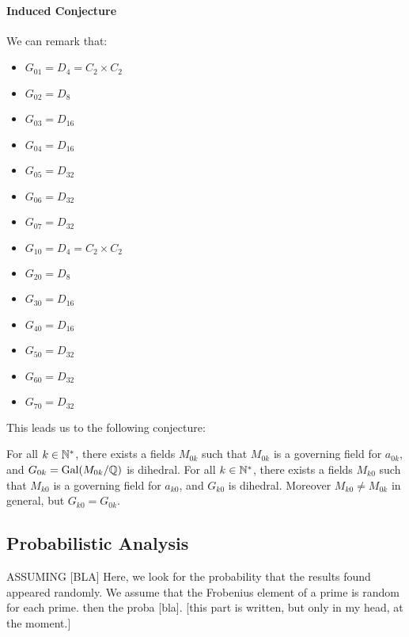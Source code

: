 \paragraph{Induced Conjecture}
We can remark that:
\begin{multicols}{2}
	\begin{itemize}
		\item $G_{01} = D_4 = C_2 \times C_2$
		\item $G_{02} = D_8$
		\item $G_{03} = D_{16}$
		\item $G_{04} = D_{16}$
		\item $G_{05} = D_{32}$
		\item $G_{06} = D_{32}$
		\item $G_{07} = D_{32}$
	\end{itemize}
	\begin{itemize}
		\item $G_{10} = D_4 = C_2 \times C_2$
		\item $G_{20} = D_8$
		\item $G_{30} = D_{16}$
		\item $G_{40} = D_{16}$
		\item $G_{50} = D_{32}$
		\item $G_{60} = D_{32}$
		\item $G_{70} = D_{32}$
	\end{itemize}
\end{multicols}

This leads us to the following conjecture:
\label{diagonalGoverningGroupsConjecture}
\begin{conjecture}
	For all $k \in \mathbb{N}^*$, there exists a fields $M_{0k}$ such that $M_{0k}$ is a governing field for $a_{0k}$, and $G_{0k} = \text{Gal}(M_{0k}/\mathbb{Q})$ is dihedral.
	For all $k \in \mathbb{N}^*$, there exists a fields $M_{k0}$ such that $M_{k0}$ is a governing field for $a_{k0}$, and $G_{k0}$ is dihedral.
	Moreover $M_{k0} \neq M_{0k}$ in general, but $G_{k0} = G_{0k}$.
\end{conjecture}



\subsection{Probabilistic Analysis}
ASSUMING [BLA]
Here, we look for the probability that the results found appeared randomly.
We assume that the Frobenius element of a prime is random for each prime.
then the proba [bla].
[this part is written, but only in my head, at the moment.]

